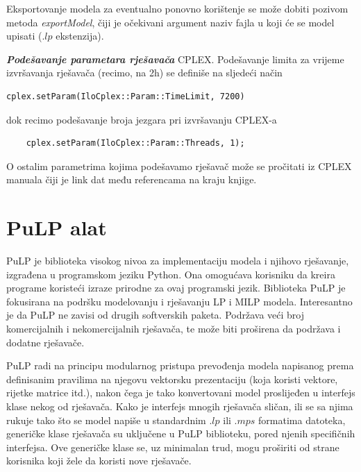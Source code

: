 \documentclass[a4paper, utf8, 11pt, colorlinks]{book}
\theoremstyle{definition}
\begin{document}
Eksportovanje modela za eventualno ponovno korištenje se može dobiti pozivom metoda \emph{exportModel}, čiji je očekivani argument naziv fajla u koji će se model upisati (.$lp$ ekstenzija).  

\emph{\textbf{Podešavanje parametara rješavača}} \textrm{CPLEX}. Podešavanje limita za vrijeme izvršavanja rješavača (recimo, na 2h) se definiše na sljedeći način
\begin{verbatim}
cplex.setParam(IloCplex::Param::TimeLimit, 7200)
\end{verbatim}
dok recimo podešavanje broja jezgara pri izvršavanju CPLEX-a 
\begin{verbatim}
	cplex.setParam(IloCplex::Param::Threads, 1);
\end{verbatim}
O ostalim parametrima kojima podešavamo rješavač može se pročitati iz \textrm{CPLEX} manuala čiji je link dat  među referencama na kraju knjige.
 \section{PuLP alat}
 PuLP je biblioteka visokog nivoa za implementaciju modela i njihovo rješavanje, izgrađena u programskom jeziku Python.  
 Ona omogućava korisniku da kreira programe koristeći izraze prirodne za ovaj programski jezik. Biblioteka PuLP je fokusirana na podršku modelovanju i rješavanju LP i MILP modela. Interesantno je da PuLP 
 ne zavisi od  drugih softverskih paketa.   Podržava veći broj komercijalnih i nekomercijalnih rješavača, te može biti proširena da podržava i dodatne rješavače. 
 
 PuLP radi na principu modularnog pristupa prevođenja modela napisanog prema definisanim pravilima na njegovu vektorsku prezentaciju (koja koristi vektore, rijetke matrice itd.), nakon čega je tako konvertovani model proslijeđen u interfejs klase nekog od rješavača. Kako je interfejs mnogih rješavača sličan, ili se sa njima rukuje tako što se model napiše u standardnim .$lp$ ili .$mps$  formatima  datoteka, generičke klase rješavača su uključene  u PuLP biblioteku, pored njenih specifičnih interfejsa.  %
 Ove generičke klase se, uz minimalan trud, mogu proširiti od strane korisnika koji žele da koristi nove rješavače.   
 
\end{document}
